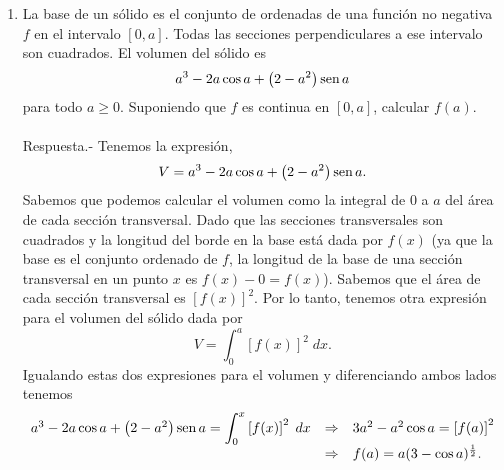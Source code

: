 \begin{enumerate}[\bfseries 1.]
    \item La base de un sólido es el conjunto de ordenadas de una función no negativa $f$ en el intervalo $[0,a]$. Todas las secciones perpendiculares a ese intervalo son cuadrados. El volumen del sólido es 
    $$a^3-2a\cos a + \left(2-a^2\right)\mathop{\mbox{\normalfont sen}}\nolimits a$$
    para todo $a\geq 0$. Suponiendo que $f$ es continua en $[0,a]$, calcular $f(a)$.\\\\
	Respuesta.-\; Tenemos la expresión,
	$$V=a^3-2a\cos a + \left(2-a^2\right)\mathop{\mbox{\normalfont sen}}\nolimits a.$$
	Sabemos que podemos calcular el volumen como la integral de $0$ a $a$ del área de cada sección transversal. Dado que las secciones transversales son cuadrados y la longitud del borde en la base está dada por $f(x)$ (ya que la base es el conjunto ordenado de $f$, la longitud de la base de una sección transversal en un punto $x$ es $f(x)-0=f(x)$). Sabemos que el área de cada sección transversal es $\left[f(x)\right]^2$. Por lo tanto, tenemos otra expresión para el volumen del sólido dada por
	$$V=\int_0^a \left[f(x)\right]^2\; dx.$$
	Igualando estas dos expresiones para el volumen y diferenciando ambos lados tenemos
	$$\begin{array}{rcl}
	    a^3-2a\cos a + \left(2-a^2\right)\mathop{\mbox{\normalfont sen}}\nolimits a = \displaystyle \int_0^x \left[f(x)\right]^2\; dx &\Rightarrow& 3a^2-a^2\cos a = \left[f(a)\right]^2\\
														  &\Rightarrow& f(a)=a(3-\cos a)^{\frac{1}{2}}.
	\end{array}$$
	\vspace{.5cm}


\end{enumerate}

